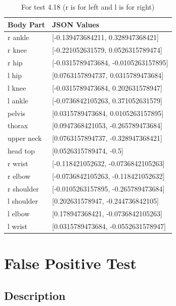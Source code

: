 \documentclass{scrreprt}
\begin{document}
\begin{table}[H]
    \centering
    \caption{For test 4.18 (r is for left and l is for right)}
    \begin{tabular}{||p{2cm}|p{6.5cm}||}
        \hline
        \textbf{Body Part} & \textbf {JSON Values}\\
         \hline\hline
        r ankle & [-0.139473684211, 0.328947368421]\\
        \hline
        r knee & [-0.221052631579, 0.0526315789474]\\
        \hline
        r hip & [-0.0315789473684, -0.0105263157895] \\
        \hline
        l hip & [0.0763157894737, 0.0315789473684] \\
        \hline
        l knee & [-0.0315789473684, 0.202631578947] \\
        \hline
        l ankle & [-0.0736842105263, 0.371052631579]\\
        \hline
        pelvis & [0.0315789473684, 0.0105263157895] \\
        \hline
        thorax & [0.0947368421053, -0.265789473684] \\
        \hline
        upper neck & [0.0763157894737, -0.328947368421] \\
        \hline
        head top & [0.0526315789474, -0.5] \\
        \hline
        r wrist & [-0.118421052632, -0.0736842105263]\\
        \hline
        r elbow & [-0.0736842105263, -0.118421052632]\\
        \hline
        r shoulder & [-0.0105263157895, -0.265789473684] \\
        \hline
        l shoulder & [0.202631578947, -0.244736842105] \\
        \hline
        l elbow & [0.178947368421, -0.0736842105263] \\
        \hline
        l wrist & [0.0315789473684, -0.0552631578947] \\
        \hline
    \end{tabular}
\end{table}

\section{False Positive Test}
\subsection{Description}
\end{document}
